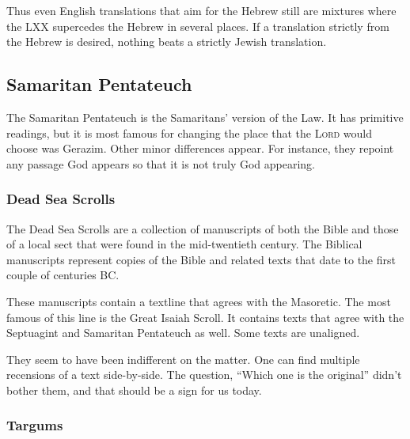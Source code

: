 \documentclass{beamer}
\begin{document}
\begin{frame}
  Thus even English translations that aim for the Hebrew still are mixtures where the LXX supercedes the Hebrew in several places.
  If a translation strictly from the Hebrew is desired, nothing beats a strictly Jewish translation.
\end{frame}

\subsection{Samaritan Pentateuch}

\begin{frame}
  The Samaritan Pentateuch is the Samaritans' version of the Law.
  It has primitive readings, but it is most famous for changing the place that the \textsc{Lord} would choose was Gerazim.
  Other minor differences appear.
  For instance, they repoint any passage God appears so that it is not truly God appearing.
\end{frame}

\subsubsection{Dead Sea Scrolls}

\begin{frame}
  The Dead Sea Scrolls are a collection of manuscripts of both the Bible and those of a local sect that were found in the mid-twentieth century.
  The Biblical manuscripts represent copies of the Bible and related texts that date to the first couple of centuries BC.
\end{frame}

\begin{frame}
  These manuscripts contain a textline that agrees with the Masoretic.
  The most famous of this line is the Great Isaiah Scroll.
  It contains texts that agree with the Septuagint and Samaritan Pentateuch as well.
  Some texts are unaligned.
\end{frame}

\begin{frame}
  They seem to have been indifferent on the matter.
  One can find multiple recensions of a text side-by-side.
  The question, ``Which one is the original'' didn't bother them, and that should be a sign for us today.
\end{frame}

\subsubsection{Targums}
\end{document}
